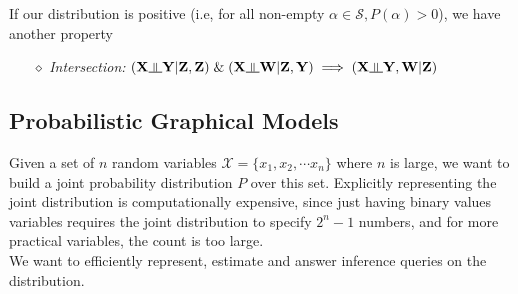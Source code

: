 If our distribution is positive (i.e, for all non-empty $\alpha \in \mathcal S, P(\alpha) > 0$), we have another property
\begin{itemize}[leftmargin=1cm]
	\item[$\diamond$] \textit{Intersection:}  $(\mathbf X \ind \mathbf Y|\mathbf Z, \mathbf Z)\; \& \;(\mathbf X \ind \mathbf W|\mathbf Z, \mathbf Y) \implies (\mathbf X \ind \mathbf Y, \mathbf W|\mathbf Z)$
\end{itemize}

\subsection{Probabilistic Graphical Models}
Given a set of $n$ random variables $\mathcal{X} = \{x_1, x_2, \cdots x_n\}$ where $n$ is large, we want to build a joint probability distribution $P$ over this set. Explicitly representing the joint distribution is computationally expensive, since just having binary values variables requires the joint distribution to specify $2^n-1$ numbers, and for more practical variables, the count is too large. \\
We want to efficiently represent, estimate and answer inference queries on the distribution.
